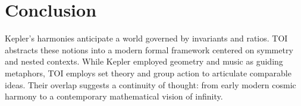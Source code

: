 \documentclass[11pt]{article}
\begin{document}
\section*{Conclusion}
Kepler's harmonies anticipate a world governed by invariants and ratios. TOI abstracts these notions into a modern formal framework centered on symmetry and nested contexts. While Kepler employed geometry and music as guiding metaphors, TOI employs set theory and group action to articulate comparable ideas. Their overlap suggests a continuity of thought: from early modern cosmic harmony to a contemporary mathematical vision of infinity.
\end{document}
